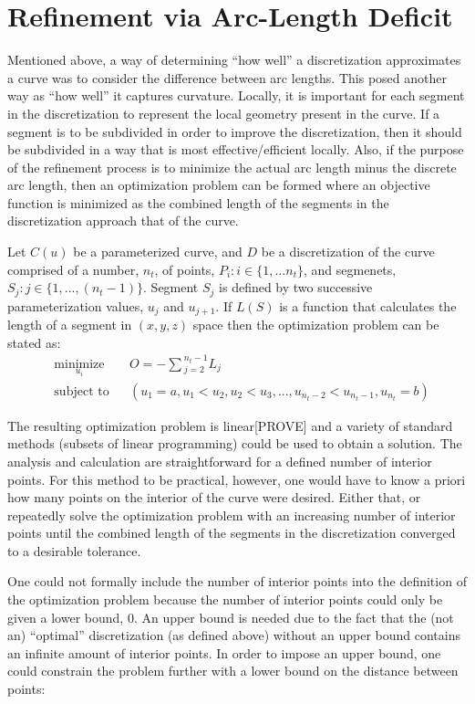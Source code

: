 \section{Refinement via Arc-Length Deficit}
Mentioned above, a way of determining ``how well'' a discretization approximates a curve was to consider the difference between arc lengths.  This posed another way as ``how well'' it captures curvature.  Locally, it is important for each segment in the discretization to represent the local geometry present in the curve.  If a segment is to be subdivided in order to improve the discretization, then it should be subdivided in a way that is most effective/efficient locally.  Also, if the purpose of the refinement process is to minimize the actual arc length minus the discrete arc length, then an optimization problem can be formed where an objective function is minimized as the combined length of the segments in the discretization approach that of the curve.

Let $C(u)$ be a parameterized curve, and $D$ be a discretization of the curve comprised of a number, $n_t$, of points, $P_i : i \in \{1,...n_t\}$, and segmenets, $S_j : j \in \{1,...,(n_t-1)\}$. Segment $S_j$ is defined by two successive parameterization values, $u_j$ and $u_{j+1}$. If $L(S)$ is a function that calculates the length of a segment  in $(x,y,z)$ space then the optimization problem can be stated as:
\begin{equation}
\begin{aligned}
& \underset{u_i}{\text{minimize}}
&& O=-\sum{_{j=2}^{n_t-1}L_j} \\
& \text{subject to}
&& (u_1 = a, u_1<u_2, u_2<u_3,..., u_{n_t-2}< u_{n_t-1}, u_{n_t} = b)
\end{aligned}
\end{equation}

\noindent The resulting optimization problem is linear[PROVE] and a variety of standard methods (subsets of linear programming) could be used to obtain a solution.  The analysis and calculation are straightforward for a defined number of interior points.  For this method to be practical, however, one would have to know a priori how many points on the interior of the curve were desired.  Either that, or repeatedly solve the optimization problem with an increasing number of interior points until the combined length of the segments in the discretization converged to a desirable tolerance.

One could not formally include the number of interior points into the definition of the optimization problem because the number of interior points could only be given a lower bound, 0.  An upper bound is needed due to the fact that the (not an) ``optimal'' discretization (as defined above) without an upper bound contains an infinite amount of interior points.  In order to impose an upper bound, one could constrain the problem further with a lower bound on the distance between points:

